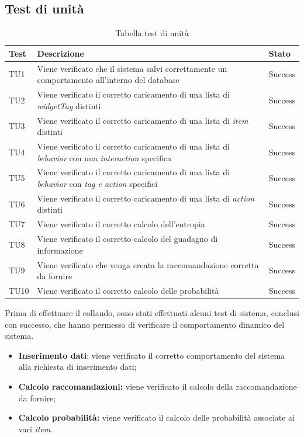 \subsection*{Test di unità}
\begin{center}
	\begin{table}[h]
		\begin{tabular}{|l|p{}|l|}
			\toprule
			
			\textbf{Test} & \textbf{Descrizione} &  \textbf{Stato} \\
			
			\midrule
			TU1 & Viene verificato che il sistema salvi correttamente un comportamento all'interno del database & Success \\ \midrule 
			TU2 & Viene verificato il corretto caricamento di una lista di \textit{widgetTag} distinti   & Success \\ \midrule 
			TU3 & Viene verificato il corretto caricamento di una lista di \textit{item} distinti &  Success \\ \midrule
			TU4 & Viene verificato il corretto caricamento di una lista di \textit{behavior} con una  \textit{interaction} specifica & Success \\ \midrule
			TU5 & Viene verificato il corretto caricamento di una lista di \textit{behavior} con \textit{tag e action} specifici & Success \\ \midrule
			TU6 & Viene verificato il corretto caricamento di una lista di \textit{action} distinti & Success \\ \midrule
			TU7 & Viene verificato il corretto calcolo dell'entropia & Success \\ \midrule
			TU8 & Viene verificato il corretto calcolo del guadagno di informazione & Success \\ \midrule
			TU9 & Viene verificato che venga creata la raccomandazione corretta da fornire & Success \\ \midrule
			TU10 & Viene verificato il corretto calcolo delle probabilità & Success \\ 
			
			\bottomrule
			
		\end{tabular}
		\caption{Tabella test di unità}
		
	\end{table}
	
\end{center}

Prima di effettuare il collaudo, sono stati effettuati alcuni test di sistema, conclusi con successo, che hanno permesso di verificare il comportamento dinamico del sistema. 
\begin{itemize}
	\item \textbf{Inserimento dati}: viene verificato il corretto comportamento del sistema alla richiesta di inserimento dati;
	\item \textbf{Calcolo raccomandazioni:} viene verificato il calcolo della raccomandazione da fornire;
	\item \textbf{Calcolo probabilità:} viene verificato il calcolo delle probabilità associate ai vari \textit{item}.
\end{itemize}


